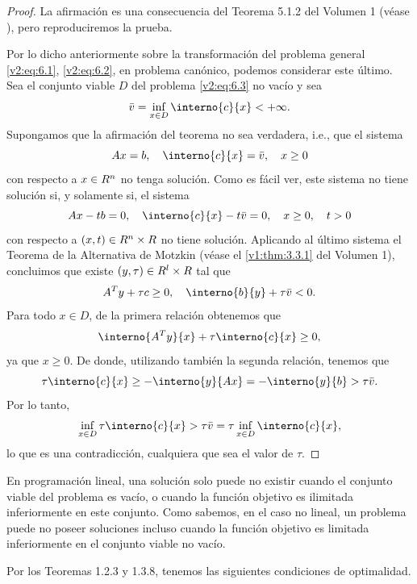 \begin{proof}
    La afirmación es una consecuencia del Teorema 5.1.2 del Volumen 1 (véase \cite[Teorema 5.1.2]{SolodovVol1}), pero reproduciremos la prueba.
    
    Por lo dicho anteriormente sobre la transformación del problema general \eqref{v2:eq:6.1}, \eqref{v2:eq:6.2}, en problema canónico, podemos considerar este último. Sea el conjunto viable $D$ del problema \eqref{v2:eq:6.3} no vacío y sea
    \[
        \bar{v} = \inf_{x \in D} \interno{c}{x} < +\infty.
    \]
    Supongamos que la afirmación del teorema no sea verdadera, i.e., que el sistema
    \[
        Ax = b, \quad \interno{c}{x} = \bar{v}, \quad x \ge 0
    \]
    con respecto a $x \in R^n$ no tenga solución. Como es fácil ver, este sistema no tiene solución si, y solamente si, el sistema
    \[
        Ax - tb = 0, \quad \interno{c}{x} - t\bar{v} = 0, \quad x \ge 0, \quad t > 0
    \]
    con respecto a $(x, t) \in R^n \times R$ no tiene solución. Aplicando al último sistema el Teorema de la Alternativa de Motzkin (véase el \cref{v1:thm:3.3.1} del Volumen 1), concluimos que existe $(y, \tau) \in R^l \times R$ tal que
    \[
        A^T y + \tau c \ge 0, \quad \interno{b}{y} + \tau \bar{v} < 0.
    \]
    Para todo $x \in D$, de la primera relación obtenemos que
    \[
        \interno{A^T y}{x} + \tau \interno{c}{x} \ge 0,
    \]
    ya que $x \ge 0$. De donde, utilizando también la segunda relación, tenemos que
    \[
        \tau \interno{c}{x} \ge -\interno{y}{Ax} = -\interno{y}{b} > \tau \bar{v}.
    \]
    Por lo tanto,
    \[
        \inf_{x \in D} \tau \interno{c}{x} > \tau \bar{v} = \tau \inf_{x \in D} \interno{c}{x},
    \]
    lo que es una contradicción, cualquiera que sea el valor de $\tau$.
\end{proof}

En programación lineal, una solución solo puede no existir cuando el conjunto viable del problema es vacío, o cuando la función objetivo es ilimitada inferiormente en este conjunto. Como sabemos, en el caso no lineal, un problema puede no poseer soluciones incluso cuando la función objetivo es limitada inferiormente en el conjunto viable no vacío.

Por los Teoremas 1.2.3 y 1.3.8, tenemos las siguientes condiciones de optimalidad.


